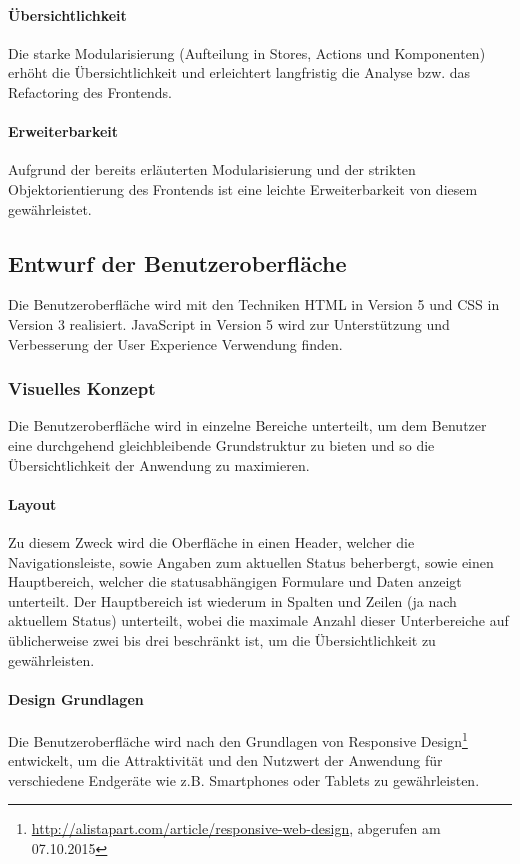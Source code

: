 \documentclass[12pt, xcolor=dvipsnames]{scrartcl}
\begin{document}
\paragraph{Übersichtlichkeit}
Die starke Modularisierung (Aufteilung in Stores, Actions und Komponenten) erhöht die Übersichtlichkeit und erleichtert langfristig die Analyse bzw. das Refactoring des Frontends.

\paragraph{Erweiterbarkeit}
Aufgrund der bereits erläuterten Modularisierung und der strikten Objektorientierung des Frontends ist eine leichte Erweiterbarkeit von diesem gewährleistet.

\subsection{Entwurf der Benutzeroberfläche}

Die Benutzeroberfläche wird mit den Techniken HTML in Version 5 und CSS in Version 3 realisiert. JavaScript in Version 5 wird zur Unterstützung und Verbesserung der User Experience Verwendung finden.

\subsubsection{Visuelles Konzept}

Die Benutzeroberfläche wird in einzelne Bereiche unterteilt, um dem Benutzer eine durchgehend gleichbleibende Grundstruktur zu bieten und so die Übersichtlichkeit der Anwendung zu maximieren.

\paragraph{Layout}
Zu diesem Zweck wird die Oberfläche in einen Header, welcher die Navigationsleiste, sowie Angaben zum aktuellen Status beherbergt, sowie einen Hauptbereich, welcher die statusabhängigen Formulare und Daten anzeigt unterteilt. Der Hauptbereich ist wiederum in Spalten und Zeilen (ja nach aktuellem Status) unterteilt, wobei die maximale Anzahl dieser Unterbereiche auf üblicherweise zwei bis drei beschränkt ist, um die Übersichtlichkeit zu gewährleisten.

\paragraph{Design Grundlagen}
Die Benutzeroberfläche wird nach den Grundlagen von
Responsive Design\footnote{\url{http://alistapart.com/article/responsive-web-design}, abgerufen am 07.10.2015}
entwickelt, um die Attraktivität und den Nutzwert der Anwendung für verschiedene Endgeräte wie z.B. Smartphones oder Tablets zu gewährleisten.
\end{document}
